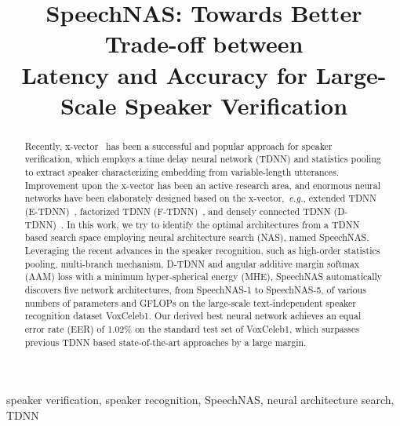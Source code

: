 \documentclass{article}
\def\eg{\emph{e.g.}}
\begin{document}
\title{SpeechNAS: Towards Better Trade-off between \\ Latency and Accuracy for Large-Scale Speaker Verification}





\address{Kuaishou Technology}




\maketitle

\begin{abstract}
Recently, x-vector~\cite{snyder2018x} has been a successful and popular approach for speaker verification, which employs a time delay neural network (TDNN) and statistics pooling to extract speaker characterizing embedding from variable-length utterances. Improvement upon the x-vector has been an active research area, and enormous neural networks have been elaborately designed based on the x-vector,~\eg, extended TDNN (E-TDNN)~\cite{snyder2019speaker}, factorized TDNN (F-TDNN)~\cite{villalba2019state}, and densely connected TDNN (D-TDNN)~\cite{yu2020densely}. In this work, we try to identify the optimal architectures from a TDNN based search space employing neural architecture search (NAS), named SpeechNAS. Leveraging the recent advances in the speaker recognition, such as high-order statistics pooling, multi-branch mechanism, D-TDNN and angular additive margin softmax (AAM) loss with a minimum hyper-spherical energy (MHE), SpeechNAS automatically discovers five network architectures, from SpeechNAS-1 to SpeechNAS-5, of various numbers of parameters and GFLOPs on the large-scale text-independent speaker recognition dataset {\selectfont VoxCeleb1}. Our derived best neural network achieves an equal error rate (EER) of 1.02\% on the standard test set of {\selectfont VoxCeleb1}, which surpasses previous TDNN based state-of-the-art approaches by a large margin. \end{abstract}
\begin{keywords}
speaker verification, speaker recognition, SpeechNAS, neural architecture search, TDNN
\end{keywords}
\end{document}
